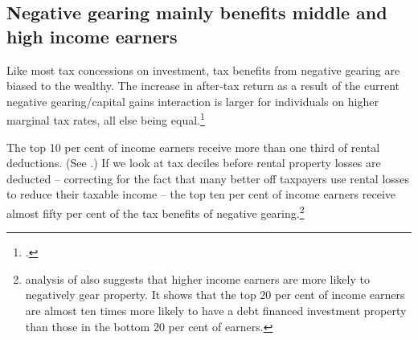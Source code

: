 \documentclass{grattan}\usepackage[]{graphicx}\usepackage[]{color}
\makeatletter
\newenvironment{kframe}{%
 \def\at@end@of@kframe{}%
 \ifinner\ifhmode%
  \def\at@end@of@kframe{\end{minipage}}%
  \begin{minipage}{\columnwidth}%
 \fi\fi%
 \def\FrameCommand##1{\hskip\@totalleftmargin \hskip-\fboxsep
 \colorbox{shadecolor}{##1}\hskip-\fboxsep
     \hskip-\linewidth \hskip-\@totalleftmargin \hskip\columnwidth}%
 \MakeFramed {\advance\hsize-\width
   \@totalleftmargin\z@ \linewidth\hsize
   \@setminipage}}%
 {\par\unskip\endMakeFramed%
 \at@end@of@kframe}
\newenvironment{knitrout}{}{} %
\makeatother
\begin{document}
\subsection{Negative gearing mainly benefits middle and high income earners}
Like most tax concessions on investment, tax benefits from negative gearing are biased to the wealthy. The increase in after-tax return as a result of the current negative gearing/capital gains interaction is larger for individuals on higher marginal tax rates, all else being equal.\footcite{Inquiry2014}   

The top 10 per cent of income earners receive more than one third of rental deductions. (See .) If we look at tax deciles before rental property losses are deducted -- correcting for the fact that many better off taxpayers use rental losses to reduce their taxable income -- the top ten per cent of income earners receive almost fifty per cent of the tax benefits of negative gearing.\footnote{\textcite{RBA2015} analysis of \textcite{HILDA2015} also suggests that higher income earners are more likely to negatively gear property. It shows that the top 20 per cent of income earners are almost ten times more likely to have a debt financed investment property than those in the bottom 20 per cent of earners.} 

\begin{knitrout}
\color{fgcolor}\begin{kframe}


{\ttfamily\noindent\bfseries{}}

{\ttfamily\noindent\bfseries{}}\end{kframe}
\end{knitrout}
\end{document}
